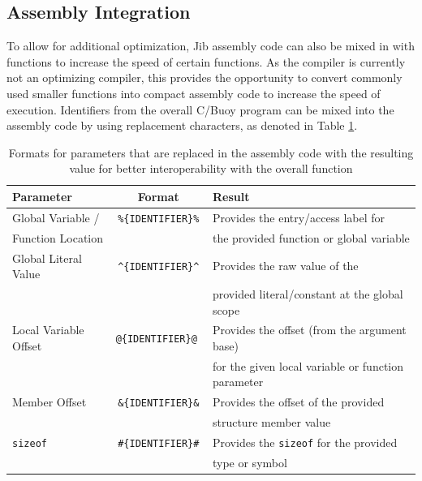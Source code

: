 \documentclass{article}
\begin{document}


\newpage

\subsection{Assembly Integration}

To allow for additional optimization, Jib assembly code can also be mixed in with functions to increase the speed of certain functions. As the compiler is currently not an optimizing compiler, this provides the opportunity to convert commonly used smaller functions into compact assembly code to increase the speed of execution. Identifiers from the overall C/Buoy program can be mixed into the assembly code by using replacement characters, as denoted in Table \ref{table:cbuoy-assembly-mixin}.

\begin{table}[h!]
    \centering
    \begin{tabular}{l|cl}
        \hline
        Parameter & Format & Result \\
        \hline
        Global Variable / & \texttt{\%\{IDENTIFIER\}\%} & Provides the entry/access label for \\ Function Location & & the provided function or global variable \\
        Global Literal Value & \texttt{\textasciicircum\{IDENTIFIER\}\textasciicircum} & Provides the raw value of the \\ & & provided literal/constant at the global scope \\
        Local Variable Offset & \texttt{@\{IDENTIFIER\}@ } & Provides the offset (from the argument base) \\ & & for the given local variable or function parameter \\
        Member Offset & \texttt{\&\{IDENTIFIER\}\&} & Provides the offset of the provided \\ & & structure member value \\
        \texttt{sizeof} & \texttt{\#\{IDENTIFIER\}\#} & Provides the \texttt{sizeof} for the provided \\ & & type or symbol \\
        \hline
    \end{tabular}
    \caption{Formats for parameters that are replaced in the assembly code with the resulting value for better interoperability with the overall function}
    \label{table:cbuoy-assembly-mixin}
\end{table}
\end{document}
